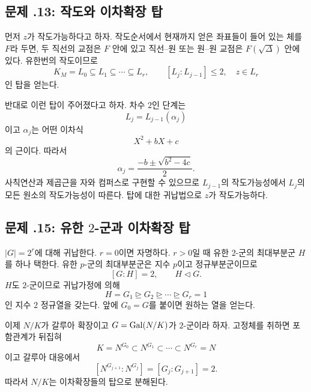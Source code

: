 \subsection*{문제 \thechapter.13: 작도와 이차확장 탑}

\begin{solution}
먼저 $z$가 작도가능하다고 하자. 작도순서에서 현재까지 얻은 좌표들이 들어 있는 체를 $F$라 두면, 두 직선의 교점은 $F$ 안에 있고 직선--원 또는 원--원 교점은 $F(\sqrt\Delta)$ 안에 있다. 유한번의 작도이므로
\[
  K_M=L_0\subseteq L_1\subseteq\cdots\subseteq L_r,
  \qquad [L_j:L_{j-1}]\le2,\quad z\in L_r
\]
인 탑을 얻는다.

반대로 이런 탑이 주어졌다고 하자. 차수 $2$인 단계는
\[
  L_j=L_{j-1}(\alpha_j)
\]
이고 $\alpha_j$는 어떤 이차식
\[
  X^2+bX+c
\]
의 근이다. 따라서
\[
  \alpha_j=\frac{-b\pm\sqrt{b^2-4c}}2.
\]
사칙연산과 제곱근을 자와 컴퍼스로 구현할 수 있으므로 $L_{j-1}$의 작도가능성에서 $L_j$의 모든 원소의 작도가능성이 따른다. 탑에 대한 귀납법으로 $z$가 작도가능하다.
\end{solution}

\subsection*{문제 \thechapter.15: 유한 $2$-군과 이차확장 탑}

\begin{solution}
$|G|=2^r$에 대해 귀납한다. $r=0$이면 자명하다. $r>0$일 때 유한 $2$-군의 최대부분군 $H$를 하나 택한다. 유한 $p$-군의 최대부분군은 지수 $p$이고 정규부분군이므로
\[
  [G:H]=2,
  \qquad H\triangleleft G.
\]
$H$도 $2$-군이므로 귀납가정에 의해
\[
  H=G_1\trianglerighteq G_2\trianglerighteq\cdots
  \trianglerighteq G_r=1
\]
인 지수 $2$ 정규열을 갖는다. 앞에 $G_0=G$를 붙이면 원하는 열을 얻는다.

이제 $N/K$가 갈루아 확장이고 $G=\operatorname{Gal}(N/K)$가 $2$-군이라 하자. 고정체를 취하면 포함관계가 뒤집혀
\[
  K=N^{G_0}\subset N^{G_1}\subset\cdots\subset N^{G_r}=N
\]
이고 갈루아 대응에서
\[
  [N^{G_{j+1}}:N^{G_j}]=[G_j:G_{j+1}]=2.
\]
따라서 $N/K$는 이차확장들의 탑으로 분해된다.
\end{solution}

